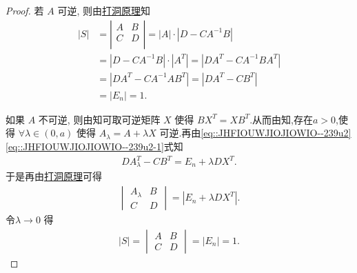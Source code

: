 \documentclass[../../main.tex]{subfiles}%
\begin{document}
\begin{proof}
若 \( A \) 可逆, 则由\hyperref[proposition:打洞原理]{打洞原理}知
\begin{align*}
|S|&=\left| \begin{matrix}
A&		B\\
C&		D\\
\end{matrix} \right|=|A|\cdot |D-CA^{-1}B|
\\
&=|D-CA^{-1}B|\cdot |A^T|=|DA^T-CA^{-1}BA^T|
\\
&=|DA^T-CA^{-1}AB^T|=|DA^T-CB^T|
\\
&=|E_n|=1.
\end{align*}

如果 \( A \) 不可逆, 则由知可取可逆矩阵 \( X \) 使得 \( BX^T = XB^T \).从而由知,存在$a>0$,使得 \(\forall \lambda \in (0,a) \) 使得 \( A_{\lambda} = A + \lambda X \) 可逆.再由\eqref{eq::JHFIOUWJIOJIOWIO--239u2}\eqref{eq::JHFIOUWJIOJIOWIO--239u2-1}式知
\begin{align*}
DA_{\lambda}^T - CB^T = E_n + \lambda DX^T. 
\end{align*}
于是再由\hyperref[proposition:打洞原理]{打洞原理}可得
\begin{align*}
\begin{vmatrix} A_{\lambda} & B \\ C & D \end{vmatrix} = |E_n + \lambda DX^T|.
\end{align*}
令\( \lambda \to 0 \) 得
\begin{align*}
|S| = \begin{vmatrix} A & B \\ C & D \end{vmatrix} = |E_n| = 1.
\end{align*}
\end{proof}
\end{document}
